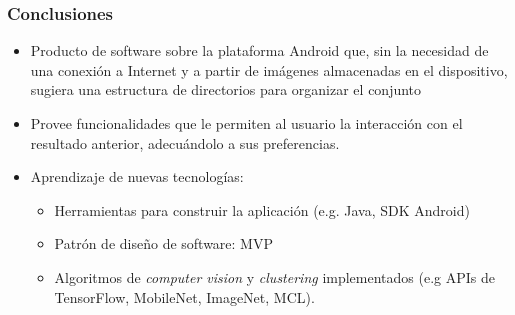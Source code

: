 \begin{frame}[t,fragile]
\frametitle {Conclusiones}

	\begin{itemize}
		\item \small{Producto de software sobre la plataforma Android que, sin la necesidad de una conexión a Internet y a partir de imágenes almacenadas en el dispositivo, sugiera una estructura de directorios para organizar el conjunto}
		\vspace{3mm}
		\item Provee funcionalidades que le permiten al usuario la interacción con el resultado anterior, adecuándolo a sus preferencias.
		\vspace{3mm}
		\item Aprendizaje de nuevas tecnologías: 
		
		\begin{itemize}
			\item Herramientas para construir la aplicación (e.g. Java, SDK Android)
			
			\item Patrón de diseño de software: MVP
			
			\item Algoritmos de \textit{computer vision} y \textit{clustering} implementados (e.g APIs de TensorFlow, MobileNet, ImageNet, MCL).
		\end{itemize}
		
	\end{itemize}
\end{frame}

